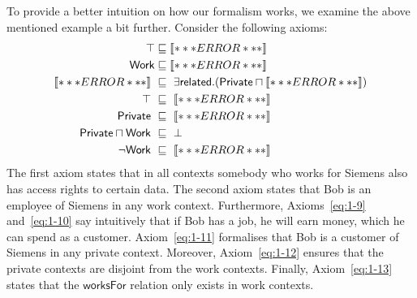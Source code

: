 To provide a better intuition on how our formalism works, we examine the above mentioned example a bit
further.  Consider the following axioms:
\begin{align}
  \top & \sqsubseteq \oax{\exists\mathsf{worksFor}.\{\text{\textit{Siemens}}\} \sqsubseteq \exists\mathsf{hasAccessRights}.\{\text{\textit{Siemens}}\}}\label{eq:1-7} \\
  \mathsf{Work} & \sqsubseteq \oax{\mathsf{worksFor}(\text{\textit{Bob}},\text{\textit{Siemens}})} \label{eq:1-8}\\
  \oax{(\exists\mathsf{worksFor}.\top)(\text{\textit{Bob}})}\
  & \sqsubseteq\ \exists\mathsf{related}.(\mathsf{Private} \sqcap \oax{\mathsf{HasMoney}(\text{\textit{Bob}})})\label{eq:1-9} \\
  \top\
  & \sqsubseteq\ \oax{\exists\mathsf{isCustomerOf}.\top \sqsubseteq\mathsf{HasMoney}} \label{eq:1-10}\\
  \mathsf{Private}\
  & \sqsubseteq\ \oax{\mathsf{isCustomerOf}(\text{\textit{Bob}},\text{\textit{Siemens}})}\label{eq:1-11}\\
  \mathsf{Private} \sqcap \mathsf{Work}\
  & \sqsubseteq\ \bot\label{eq:1-12}\\
  \lnot \mathsf{Work}\
  & \sqsubseteq\ \oax{\exists\mathsf{worksFor}.\top\sqsubseteq\bot}\label{eq:1-13}
\end{align}
%
The first axiom states that in all contexts somebody who
works for Siemens also has access rights to certain data.  The second axiom
states that Bob is an employee of Siemens in any work context.  Furthermore,
Axioms~\eqref{eq:1-9} and~\eqref{eq:1-10} say intuitively that if Bob has a job, he will earn money,
which he can spend as a customer.  Axiom~\eqref{eq:1-11} formalises that Bob is a customer
of Siemens in any private context.  Moreover, Axiom~\eqref{eq:1-12} ensures that the private
contexts are disjoint from the work contexts.  Finally, Axiom~\eqref{eq:1-13} states that
the $\mathsf{worksFor}$ relation only exists in work contexts.

